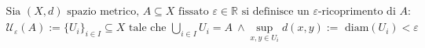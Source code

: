\documentclass[preview]{standalone}
\begin{document}
\begin{align*}
\text{Sia } (X, d) \text{ spazio metrico, } A \subseteq X \text{ fissato } \varepsilon \in \mathbb{R} \text{ si definisce un } \varepsilon\text{-ricoprimento di } A: \\ \mathcal{U}_\varepsilon(A) :=  \{U_i\}_{i \in I} \subseteq X \text{  tale che } \bigcup_{i \in I} U_i = A  \ \land \sup_{x,y \in U_i} d(x,y) := \text{ diam}(U_i)< \varepsilon
\end{align*}
\end{document}
